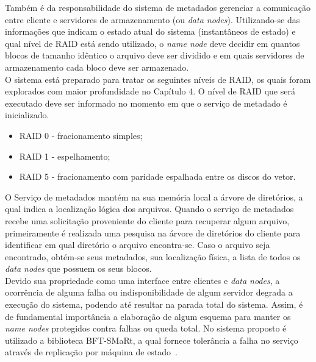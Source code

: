 Também é da responsabilidade do sistema de metadados gerenciar a comunicação entre cliente e servidores de armazenamento (ou  \textit{data nodes}). Utilizando-se das informações que indicam o estado atual do sistema (instantâneos de estado) e qual nível de RAID está sendo utilizado, o \textit{name node} deve decidir em quantos blocos de tamanho idêntico o arquivo deve ser dividido e em quais servidores de armazenamento cada bloco deve ser armazenado.
\\ 

O sistema está preparado para tratar os seguintes níveis de RAID, os quais foram explorados com maior profundidade no Capítulo 4. O nível de RAID que será executado deve ser informado no momento em que o serviço de metadado é inicializado.
\\

\begin{itemize}
	\item RAID 0 - fracionamento simples;
	\item RAID 1 - espelhamento;
	\item RAID 5 - fracionamento com paridade espalhada entre os discos do vetor.
\end{itemize}

O Serviço de metadados mantém na sua memória local a árvore de diretórios, a qual indica a localização lógica dos arquivos. Quando o serviço de metadados recebe uma solicitação proveniente do cliente para recuperar algum arquivo, primeiramente é realizada uma pesquisa na árvore de diretórios do cliente para identificar em qual diretório o arquivo encontra-se. Caso o arquivo seja encontrado, obtém-se seus metadados, sua localização física, a lista de todos os \textit{data nodes} que possuem os seus blocos.
\\

Devido sua propriedade como uma interface entre clientes e \textit{data nodes}, a ocorrência de alguma falha ou indisponibilidade de algum servidor degrada a execução do sistema, podendo até resultar na parada total do sistema. Assim, é de fundamental importância a elaboração de algum esquema para manter os \textit{name nodes} protegidos contra falhas ou queda total. No sistema proposto é utilizado a biblioteca BFT-SMaRt, a qual fornece tolerância a falha no serviço através de replicação por máquina de estado~\citep{bessani3}. 
\\

